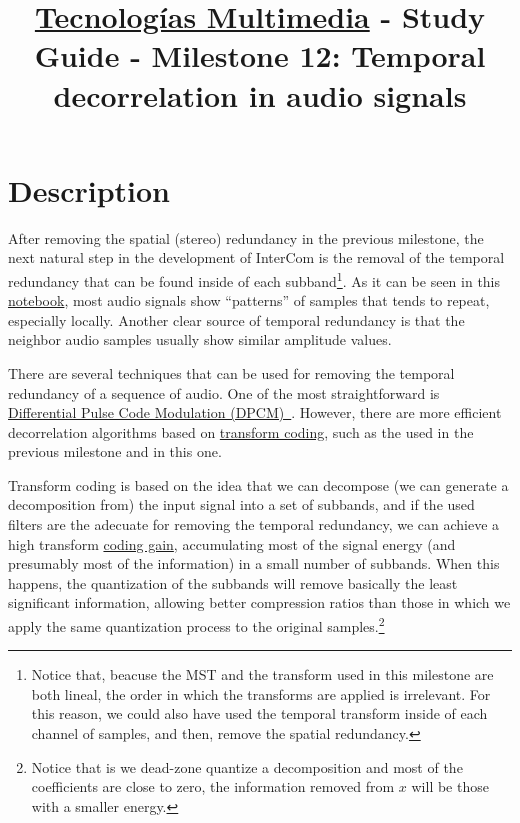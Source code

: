 \title{\href{https://www.ual.es/estudios/grados/presentacion/plandeestudios/asignatura/4015/40154321?idioma=zh_CN}{Tecnologías Multimedia} - Study Guide - Milestone 12: Temporal decorrelation in audio signals}

\maketitle

\section{Description}

After removing the spatial (stereo) redundancy in the previous
milestone, the next natural step in the development of InterCom is the
removal of the temporal redundancy that can be found inside of each
subband\footnote{Notice that, beacuse the MST and the transform used
  in this milestone are both lineal, the order in which the transforms
  are applied is irrelevant. For this reason, we could also have used
  the temporal transform inside of each channel of samples, and then,
  remove the spatial redundancy.}. As it can be seen in this
\href{}{notebook}, most audio signals show ``patterns'' of samples
that tends to repeat, especially locally. Another clear source of
temporal redundancy is that the neighbor audio samples usually show
similar amplitude values.

There are several techniques that can be used for removing the
temporal redundancy of a sequence of audio. One of the most
straightforward is
\href{https://en.wikipedia.org/wiki/Differential_pulse-code_modulation}{Differential
  Pulse Code Modulation
  (DPCM)~\cite{sayood2017introduction}}. However, there are more
efficient decorrelation algorithms based on
\href{https://en.wikipedia.org/wiki/Transform_coding}{transform
  coding}, such as the used in the previous milestone and in this one.

Transform coding is based on the idea that we can decompose (we can
generate a decomposition from) the input signal into a set of
subbands, and if the used filters are the adecuate for removing the
temporal redundancy, we can achieve a high transform
\href{https://en.wikipedia.org/wiki/Coding_gain}{coding gain},
accumulating most of the signal energy (and presumably most of the
information) in a small number of subbands. When this happens, the
quantization of the subbands will remove basically the least
significant information, allowing better compression ratios than those
in which we apply the same quantization process to the original
samples.\footnote{Notice that is we dead-zone quantize a decomposition
  and most of the coefficients are close to zero, the information
  removed from $x$ will be those with a smaller energy.}

